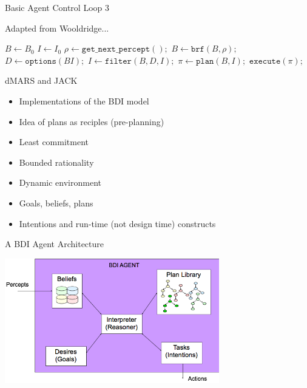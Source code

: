 \documentclass[aspectratio=1610,xcolor=dvipsnames,t]{beamer}
\begin{document}
\begin{frame}{Basic Agent Control Loop 3} 
    \begin{block}{Adapted from Wooldridge...} 
        \begin{algorithmic}[0] 
                \State $B \gets B_0$
                \State $I \gets I_0$
                    \State $\rho \gets \texttt{get\_next\_percept}();$
                    \State $B \gets \texttt{brf}(B, \rho);$
                    \State $D \gets \texttt{options}(B I);$ 
                    \State $I \gets \texttt{filter}(B, D, I); $
                    \State $\pi \gets \texttt{plan}(B, I); $
                    \State $\texttt{execute}(\pi); $
                \EndWhile
            \EndProcedure
        \end{algorithmic} 
    \end{block} 
\end{frame} 

\begin{frame}{dMARS and JACK} 
    \begin{itemize} 
        \item Implementations of the BDI model
        \item Idea of plans as reciples (pre-planning) 
        \item Least commitment 
        \item Bounded rationality
        \item Dynamic environment
        \item Goals, beliefs, plans
        \item Intentions and run-time (not design time) constructs
    \end{itemize} 
\end{frame} 

\begin{frame}{A BDI Agent Architecture} 
    \begin{center} 
        \includegraphics[width=0.7\textwidth]{reasoner} 
    \end{center} 
\end{frame} 
\end{document}
